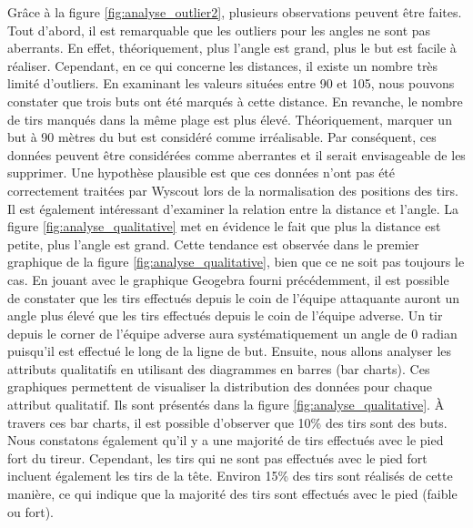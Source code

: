 \documentclass[12pt]{article}
\begin{document}
Grâce à la figure \ref{fig:analyse_outlier2}, plusieurs observations peuvent être faites. 
Tout d'abord, il est remarquable que les outliers pour les angles ne sont pas aberrants. 
En effet, théoriquement, plus l'angle est grand, plus le but est facile à réaliser. 
Cependant, en ce qui concerne les distances, il existe un nombre très limité d'outliers. 
En examinant les valeurs situées entre 90 et 105, nous pouvons constater que trois buts ont été marqués à cette distance. 
En revanche, le nombre de tirs manqués dans la même plage est plus élevé.
Théoriquement, marquer un but à 90 mètres du but est considéré comme irréalisable. 
Par conséquent, ces données peuvent être considérées comme aberrantes et il serait envisageable de les supprimer. 
Une hypothèse plausible est que ces données n'ont pas été correctement traitées par Wyscout lors de la normalisation des positions des tirs.
\newline\newline
Il est également intéressant d'examiner la relation entre la distance et l'angle. 
La figure \ref{fig:analyse_qualitative} met en évidence le fait que plus la distance est petite, plus l'angle est grand. 
Cette tendance est observée dans le premier graphique de la figure \ref{fig:analyse_qualitative}, bien que ce ne soit pas toujours le cas. 
En jouant avec le graphique Geogebra fourni précédemment, il est possible de constater que les tirs effectués depuis le coin de l'équipe attaquante auront un angle plus élevé que les tirs effectués depuis le coin de l'équipe adverse.
Un tir depuis le corner de l'équipe adverse aura systématiquement un angle de 0 radian puisqu'il est effectué le long de la ligne de but.
\newline\newline
Ensuite, nous allons analyser les attributs qualitatifs en utilisant des diagrammes en barres (bar charts). 
Ces graphiques permettent de visualiser la distribution des données pour chaque attribut qualitatif. 
Ils sont présentés dans la figure \ref{fig:analyse_qualitative}. 
À travers ces bar charts, il est possible d'observer que 10\% des tirs sont des buts. 
Nous constatons également qu'il y a une majorité de tirs effectués avec le pied fort du tireur. 
Cependant, les tirs qui ne sont pas effectués avec le pied fort incluent également les tirs de la tête.
Environ 15\% des tirs sont réalisés de cette manière, ce qui indique que la majorité des tirs sont effectués avec le pied (faible ou fort).
\newline\newline
\end{document}
